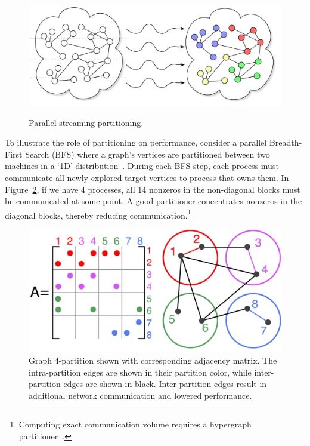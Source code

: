\begin{figure}[ht]
\centering
  \includegraphics[width=0.7\columnwidth]{figures/coverfig.pdf}
  \label{fig:coverfig}
  \caption{Parallel streaming partitioning.}
\end{figure}

To illustrate the role of partitioning on performance, consider a parallel Breadth-First Search (BFS) where a graph's vertices are partitioned between two machines in a `1D' distribution~\cite{Buluc2D}. During each BFS step, each process must communicate all newly explored target vertices to process that owns them. In Figure~\ref{fig:0}, if we have 4 processes, all 14 nonzeros in the non-diagonal blocks must be communicated at some point. A good partitioner concentrates nonzeros in the diagonal blocks, thereby reducing communication.\footnote{Computing exact communication volume requires a hypergraph partitioner~\cite{hypergraph}.} 

\begin{figure}[h]
\centering
\includegraphics[width=0.85\columnwidth] {figures/graphpart1.pdf}
\caption[Caption for]{Graph 4-partition shown with corresponding adjacency matrix. The intra-partition edges are shown in their partition color, while inter-partition edges are shown in black.  Inter-partition edges result in additional network communication and lowered performance. }
\label{fig:0}
\end{figure}

